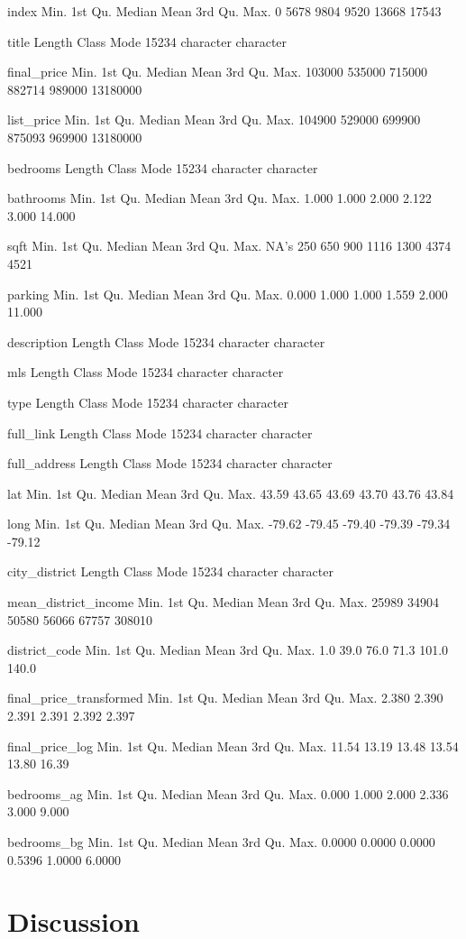 \documentclass[11pt,]{article}
\begin{document}
index Min. 1st Qu. Median Mean 3rd Qu. Max. 0 5678 9804 9520 13668 17543

title Length Class Mode 15234 character character

final\_price Min. 1st Qu. Median Mean 3rd Qu. Max. 103000 535000 715000
882714 989000 13180000

list\_price Min. 1st Qu. Median Mean 3rd Qu. Max. 104900 529000 699900
875093 969900 13180000

bedrooms Length Class Mode 15234 character character

bathrooms Min. 1st Qu. Median Mean 3rd Qu. Max. 1.000 1.000 2.000 2.122
3.000 14.000

sqft Min. 1st Qu. Median Mean 3rd Qu. Max. NA's 250 650 900 1116 1300
4374 4521

parking Min. 1st Qu. Median Mean 3rd Qu. Max. 0.000 1.000 1.000 1.559
2.000 11.000

description Length Class Mode 15234 character character

mls Length Class Mode 15234 character character

type Length Class Mode 15234 character character

full\_link Length Class Mode 15234 character character

full\_address Length Class Mode 15234 character character

lat Min. 1st Qu. Median Mean 3rd Qu. Max. 43.59 43.65 43.69 43.70 43.76
43.84

long Min. 1st Qu. Median Mean 3rd Qu. Max. -79.62 -79.45 -79.40 -79.39
-79.34 -79.12

city\_district Length Class Mode 15234 character character

mean\_district\_income Min. 1st Qu. Median Mean 3rd Qu. Max. 25989 34904
50580 56066 67757 308010

district\_code Min. 1st Qu. Median Mean 3rd Qu. Max. 1.0 39.0 76.0 71.3
101.0 140.0

final\_price\_transformed Min. 1st Qu. Median Mean 3rd Qu. Max. 2.380
2.390 2.391 2.391 2.392 2.397

final\_price\_log Min. 1st Qu. Median Mean 3rd Qu. Max. 11.54 13.19
13.48 13.54 13.80 16.39

bedrooms\_ag Min. 1st Qu. Median Mean 3rd Qu. Max. 0.000 1.000 2.000
2.336 3.000 9.000

bedrooms\_bg Min. 1st Qu. Median Mean 3rd Qu. Max. 0.0000 0.0000 0.0000
0.5396 1.0000 6.0000

\hypertarget{discussion}{%
\section{Discussion}\label{discussion}}
\end{document}
